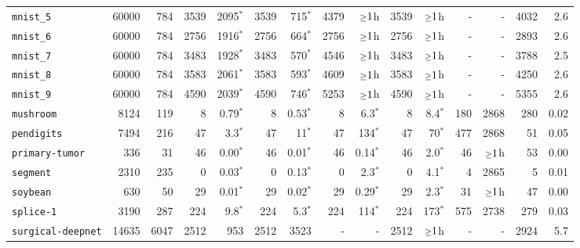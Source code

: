 \begin{tabular}{lccrrrrrrrrrrrr}
\texttt{mnist\_5} & \multicolumn{1}{r}{60000} & \multicolumn{1}{r}{784}  & 3539 & 2095$^*$ & 3539 & 715$^*$ & 4379 & $\mathsmaller{\geq}1$h & 3539 & $\mathsmaller{\geq}1$h & - & - & 4032 & 2.6\\
\texttt{mnist\_6} & \multicolumn{1}{r}{60000} & \multicolumn{1}{r}{784}  & 2756 & 1916$^*$ & 2756 & 664$^*$ & 2756 & $\mathsmaller{\geq}1$h & 2756 & $\mathsmaller{\geq}1$h & - & - & 2893 & 2.6\\
\texttt{mnist\_7} & \multicolumn{1}{r}{60000} & \multicolumn{1}{r}{784}  & 3483 & 1928$^*$ & 3483 & 570$^*$ & 4546 & $\mathsmaller{\geq}1$h & 3483 & $\mathsmaller{\geq}1$h & - & - & 3788 & 2.5\\
\texttt{mnist\_8} & \multicolumn{1}{r}{60000} & \multicolumn{1}{r}{784}  & 3583 & 2061$^*$ & 3583 & 593$^*$ & 4609 & $\mathsmaller{\geq}1$h & 3583 & $\mathsmaller{\geq}1$h & - & - & 4250 & 2.6\\
\texttt{mnist\_9} & \multicolumn{1}{r}{60000} & \multicolumn{1}{r}{784}  & 4590 & 2039$^*$ & 4590 & 746$^*$ & 5253 & $\mathsmaller{\geq}1$h & 4590 & $\mathsmaller{\geq}1$h & - & - & 5355 & 2.6\\
\texttt{mushroom} & \multicolumn{1}{r}{8124} & \multicolumn{1}{r}{119}  & 8 & 0.79$^*$ & 8 & 0.53$^*$ & 8 & 6.3$^*$ & 8 & 8.4$^*$ & 180 & 2868 & 280 & 0.02\\
\texttt{pendigits} & \multicolumn{1}{r}{7494} & \multicolumn{1}{r}{216}  & 47 & 3.3$^*$ & 47 & 11$^*$ & 47 & 134$^*$ & 47 & 70$^*$ & 477 & 2868 & 51 & 0.05\\
\texttt{primary-tumor} & \multicolumn{1}{r}{336} & \multicolumn{1}{r}{31}  & 46 & 0.00$^*$ & 46 & 0.01$^*$ & 46 & 0.14$^*$ & 46 & 2.0$^*$ & 46 & $\mathsmaller{\geq}1$h & 53 & 0.00\\
\texttt{segment} & \multicolumn{1}{r}{2310} & \multicolumn{1}{r}{235}  & 0 & 0.03$^*$ & 0 & 0.13$^*$ & 0 & 2.3$^*$ & 0 & 4.1$^*$ & 4 & 2865 & 5 & 0.01\\
\texttt{soybean} & \multicolumn{1}{r}{630} & \multicolumn{1}{r}{50}  & 29 & 0.01$^*$ & 29 & 0.02$^*$ & 29 & 0.29$^*$ & 29 & 2.3$^*$ & 31 & $\mathsmaller{\geq}1$h & 47 & 0.00\\
\texttt{splice-1} & \multicolumn{1}{r}{3190} & \multicolumn{1}{r}{287}  & 224 & 9.8$^*$ & 224 & 5.3$^*$ & 224 & 114$^*$ & 224 & 173$^*$ & 575 & 2738 & 279 & 0.03\\
\texttt{surgical-deepnet} & \multicolumn{1}{r}{14635} & \multicolumn{1}{r}{6047}  & 2512 & 953 & 2512 & 3523 & - & - & 2512 & $\mathsmaller{\geq}1$h & - & - & 2924 & 5.7\\

\end{tabular}
